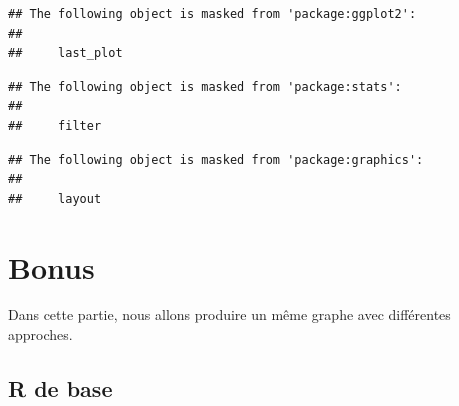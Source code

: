 \documentclass[
]{book}
\newenvironment{Shaded}{\begin{snugshade}}{\end{snugshade}}
\newcommand{\AttributeTok}[1]{\textcolor[rgb]{0.77,0.63,0.00}{#1}}
\newcommand{\DecValTok}[1]{\textcolor[rgb]{0.00,0.00,0.81}{#1}}
\newcommand{\FunctionTok}[1]{\textcolor[rgb]{0.00,0.00,0.00}{#1}}
\newcommand{\NormalTok}[1]{#1}
\newcommand{\SpecialCharTok}[1]{\textcolor[rgb]{0.00,0.00,0.00}{#1}}
\newcommand{\StringTok}[1]{\textcolor[rgb]{0.31,0.60,0.02}{#1}}
\begin{document}
\begin{verbatim}
## The following object is masked from 'package:ggplot2':
## 
##     last_plot
\end{verbatim}

\begin{verbatim}
## The following object is masked from 'package:stats':
## 
##     filter
\end{verbatim}

\begin{verbatim}
## The following object is masked from 'package:graphics':
## 
##     layout
\end{verbatim}

\begin{Shaded}
\end{Shaded}

\hypertarget{bonus}{%
\chapter{Bonus}\label{bonus}}

Dans cette partie, nous allons produire un même graphe avec différentes approches.

\hypertarget{r-de-base}{%
\section{R de base}\label{r-de-base}}

\begin{Shaded}
\end{Shaded}
\end{document}
